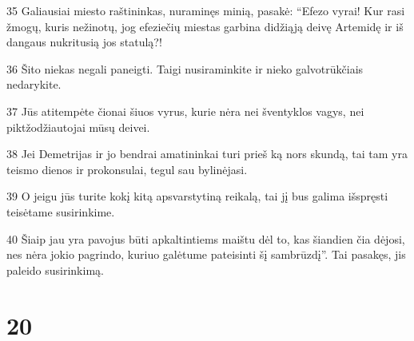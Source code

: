 \par 35 Galiausiai miesto raštininkas, nuraminęs minią, pasakė: “Efezo vyrai! Kur rasi žmogų, kuris nežinotų, jog efeziečių miestas garbina didžiąją deivę Artemidę ir iš dangaus nukritusią jos statulą?! 
\par 36 Šito niekas negali paneigti. Taigi nusiraminkite ir nieko galvotrūkčiais nedarykite. 
\par 37 Jūs atitempėte čionai šiuos vyrus, kurie nėra nei šventyklos vagys, nei piktžodžiautojai mūsų deivei. 
\par 38 Jei Demetrijas ir jo bendrai amatininkai turi prieš ką nors skundą, tai tam yra teismo dienos ir prokonsulai, tegul sau bylinėjasi. 
\par 39 O jeigu jūs turite kokį kitą apsvarstytiną reikalą, tai jį bus galima išspręsti teisėtame susirinkime. 
\par 40 Šiaip jau yra pavojus būti apkaltintiems maištu dėl to, kas šiandien čia dėjosi, nes nėra jokio pagrindo, kuriuo galėtume pateisinti šį sambrūzdį”. Tai pasakęs, jis paleido susirinkimą.


\chapter{20}


